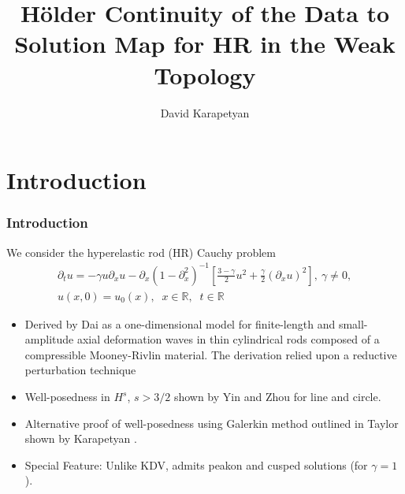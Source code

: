\documentclass[handout]{beamer}
\date{}
\title{H\"older Continuity of the Data to Solution Map for HR in the
Weak Topology}
\author{David Karapetyan}
\institute{University of Notre Dame}
\numberwithin{equation}{section}
\newcommand{\rr}{\mathbb{R}}
\newcommand{\p}{\partial}
\begin{document}
\begin{frame}
    \titlepage
\end{frame}



        \section{Introduction}
        \begin{frame}
            \frametitle{Introduction}
We consider the hyperelastic rod (HR) Cauchy problem
\begin{gather*}
 \p_t u =  -\gamma u \p_x u -
 \p_{x} (1 - \p_{x}^{2})^{-1} \left[ \frac{3-\gamma}{2}u^2 +
\frac{\gamma}{2} \left( \p_x u \right)^2
\right], \ \gamma \neq 0,
\label{hyperelastic-rod-equation}
\\
 u(x,0) = u_0(x), \; \; x \in \rr, \; \; t \in \rr
\label{init-cond}
\end{gather*}

\begin{itemize}
    \item Derived by Dai \cite{Dai_1998_Model-equations} as a one-dimensional 
        model for finite-length and
        small-amplitude axial deformation waves in thin cylindrical
        rods composed of a compressible Mooney-Rivlin
        material. The derivation relied upon a reductive perturbation technique 
    \item Well-posedness in $H^{s}$, $s > 3/2$ shown by Yin
        \cite{Yin_2003_On-the-Cauchy-p} and Zhou
        \cite{Zhou_2005_Local-well-pose} for line and circle.
    \item Alternative proof of well-posedness using Galerkin method
outlined in Taylor \cite{Taylor_1991_Pseudodifferent} shown by Karapetyan \cite{Karapetyan:2010fk}. 
\item Special Feature: Unlike KDV, admits peakon and cusped solutions (for
    $\gamma =1$).
\end{itemize}
\end{frame}
\end{document}
